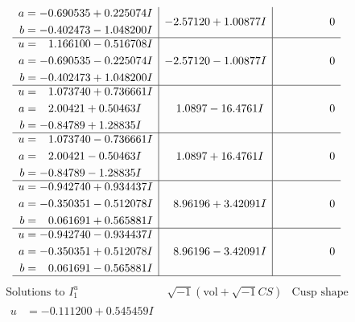 \documentclass[1p]{elsarticle_modified}
\theoremstyle{definition}
\newcommand{\I}{\sqrt{-1}}
\begin{document}
$$\begin{array}{c|c|c}
\begin{aligned}
a &= -0.690535 + 0.225074 I \\
b &= -0.402473 - 1.048200 I\end{aligned}
 & -2.57120 + 1.00877 I & \phantom{-0.000000 } 0 \\ \hline\begin{aligned}
u &= \phantom{-}1.166100 - 0.516708 I \\
a &= -0.690535 - 0.225074 I \\
b &= -0.402473 + 1.048200 I\end{aligned}
 & -2.57120 - 1.00877 I & \phantom{-0.000000 } 0 \\ \hline\begin{aligned}
u &= \phantom{-}1.073740 + 0.736661 I \\
a &= \phantom{-}2.00421 + 0.50463 I \\
b &= -0.84789 + 1.28835 I\end{aligned}
 & \phantom{-}1.0897 - 16.4761 I & \phantom{-0.000000 } 0 \\ \hline\begin{aligned}
u &= \phantom{-}1.073740 - 0.736661 I \\
a &= \phantom{-}2.00421 - 0.50463 I \\
b &= -0.84789 - 1.28835 I\end{aligned}
 & \phantom{-}1.0897 + 16.4761 I & \phantom{-0.000000 } 0 \\ \hline\begin{aligned}
u &= -0.942740 + 0.934437 I \\
a &= -0.350351 - 0.512078 I \\
b &= \phantom{-}0.061691 + 0.565881 I\end{aligned}
 & \phantom{-}8.96196 + 3.42091 I & \phantom{-0.000000 } 0 \\ \hline\begin{aligned}
u &= -0.942740 - 0.934437 I \\
a &= -0.350351 + 0.512078 I \\
b &= \phantom{-}0.061691 - 0.565881 I\end{aligned}
 & \phantom{-}8.96196 - 3.42091 I & \phantom{-0.000000 } 0\\
 \hline 
 \end{array}$$\newpage$$\begin{array}{c|c|c}  
\text{Solutions to }I^u_{1}& \I (\text{vol} + \sqrt{-1}CS) & \text{Cusp shape}\\
 \hline 
\begin{aligned}
u &= -0.111200 + 0.545459 I \\

\end{aligned}
\end{array}$$
\end{document}
